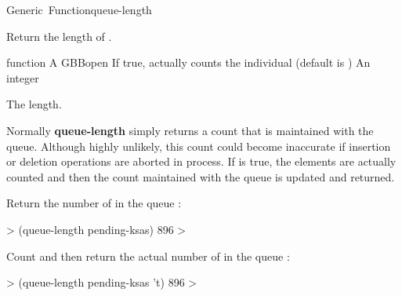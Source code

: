 \documentclass[10pt,twoside,english,pdftex]{article}
\begin{document}
\begin{functiondoc}{Generic~Function}{queue-length}{
      
    \returns{} }
%
%

\fnsyntax

\fnpurpose Return the length of .

\fnmethods
{} 

\fnpackage {}

\fnmodule {}

\fnargs
\begin{args}{function}
\arg[queue] A GBBopen 
\arg[recount-p] If true, actually counts the individual
 (default is \nil) 
\arg[integer] An integer
\end{args}

\fnreturns The  length.

\fndescription Normally \textbf{queue-length} simply returns a count
that is maintained with the queue.  Although highly unlikely, this
count could become inaccurate if  insertion or
deletion operations are aborted in process. If  is
true, the elements are actually counted and then the count maintained
with the queue is updated and returned.

\fnexamples
Return the number of  in the queue :
%
\W\supp
\begin{example}
  > (queue-length pending-ksas)
  896
  >
\end{example}
%
Count and then return the actual number of  in the
queue :
%
\W\supp\notpretop
\begin{example}
  > (queue-length pending-ksas 't)
  896
  >
\end{example}

\end{functiondoc}

\end{document}
